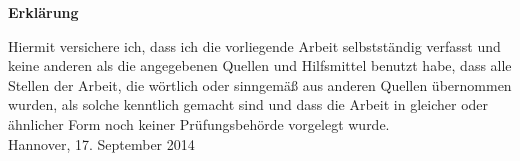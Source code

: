 \documentclass[a4paper,12pt,normalheadings,footexclude,headinclude,liststotoc,nochapterprefix,onecolumn,oneside,parskip,pointlessnumbers]{scrreprt}
\begin{document}

\newpage
\thispagestyle{empty}
\begin{center}
  {\Large\bf Erkl\"{a}rung} \\ [2.5cm]
\end{center}
\begin{flushleft}
  Hiermit versichere ich, dass ich die vorliegende Arbeit selbstst\"{a}ndig verfasst und keine anderen als die angegebenen Quellen und Hilfsmittel
  benutzt habe, dass alle Stellen der Arbeit, die w\"{o}rtlich oder sinngem\"{a}{\ss} aus anderen Quellen \"{u}bernommen wurden, als solche kenntlich gemacht
  sind und dass die Arbeit in gleicher oder \"{a}hnlicher Form noch keiner Pr\"{u}fungsbeh\"{o}rde vorgelegt wurde.\\[3cm]
  Hannover, 17. September 2014
\end{flushleft}
\newpage\thispagestyle{empty}\null\newpage
\end{document}
